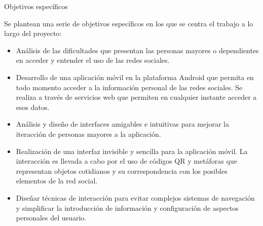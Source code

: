\documentclass[12pt,a4paper,spanish,oneside]{report}
\makeatletter
\renewcommand{\subsection}{
  \@startsection{subsection}{2}{0mm}{2mm}
  {4.0mm}{\Large\bf}
}
\theoremstyle{plain} \newtheorem{nota}{Nota}
\makeatother
\begin{document}
\subsection{Objetivos específicos}
\begin{spacing}{1.5}
Se plantean una serie de objetivos específicos en los que se centra el trabajo a
lo largo del proyecto:
\begin{itemize}
\item Análisis de las dificultades que presentan las personas mayores o 
dependientes en acceder y entender el uso de las redes sociales.
\item Desarrollo de una aplicación móvil en la plataforma Android que permita en
todo momento acceder a la información personal de las redes sociales. Se 
realiza a través de servicios web que permiten en cualquier instante acceder a 
esos datos.
\item Análisis y diseño de interfaces amigables e intuitivas para mejorar la 
iteracción de personas mayores a la aplicación.
\item Realización de una interfaz invisible y sencilla para la aplicación móvil.
La interacción es llevada a cabo por el uso de códigos QR y metáforas
 que representan objetos cotidianos y su correspondencia con los posibles 
elementos de la red social.
\item Diseñar técnicas de interacción para evitar complejos sistemas de 
navegación y simplificar la introducción de información y configuración de 
aspectos personales del usuario.
\end{itemize}
\end{spacing}
\end{document}
